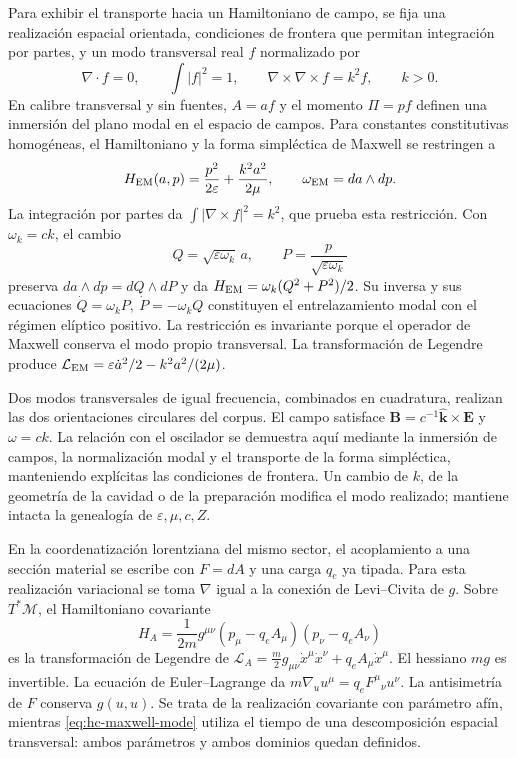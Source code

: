 Para exhibir el transporte hacia un Hamiltoniano de campo, se fija una
realización espacial orientada, condiciones de frontera que permitan
integración por partes, y un modo transversal real \(f\) normalizado por
\[
 \nabla\cdot f=0,\qquad \int|f|^2=1,\qquad
 \nabla\times\nabla\times f=k^2f,\qquad k>0.
\]
En calibre transversal y sin fuentes, \(A=af\) y el momento
\(\Pi=pf\) definen una inmersión del plano modal en el espacio de
campos. Para constantes constitutivas homogéneas, el Hamiltoniano y la
forma simpléctica de Maxwell se restringen a
\begin{equation}
 H_{\rm EM}(a,p)=\frac{p^2}{2\varepsilon}
 +\frac{k^2a^2}{2\mu},\qquad \omega_{\rm EM}=da\wedge dp.
 \label{eq:hc-maxwell-mode}
\end{equation}
La integración por partes da
\(\int|\nabla\times f|^2=k^2\), que prueba esta restricción.
Con \(\omega_k=ck\), el cambio
\begin{equation}
 Q=\sqrt{\varepsilon\omega_k}\,a,
 \qquad P=\frac{p}{\sqrt{\varepsilon\omega_k}}
 \label{eq:hc-maxwell-symplectic}
\end{equation}
preserva \(da\wedge dp=dQ\wedge dP\) y da
\(H_{\rm EM}=\omega_k(Q^2+P^2)/2\). Su inversa y sus ecuaciones
\(\dot Q=\omega_kP,\ \dot P=-\omega_kQ\)
constituyen el entrelazamiento modal con el régimen elíptico positivo.
La restricción es invariante porque el operador de Maxwell conserva el
modo propio transversal. La transformación de Legendre produce
\(\mathcal L_{\rm EM}=\varepsilon\dot a^2/2-k^2a^2/(2\mu)\).

Dos modos transversales de igual frecuencia, combinados en cuadratura,
realizan las dos orientaciones circulares del corpus. El campo satisface
\(\mathbf B=c^{-1}\widehat{\mathbf k}\times\mathbf E\) y
\(\omega=ck\). La relación con el oscilador se demuestra aquí mediante
la inmersión de campos, la normalización modal y el transporte de la forma
simpléctica, manteniendo explícitas las condiciones de frontera.
Un cambio de \(k\), de la geometría de la cavidad o de la preparación
modifica el modo realizado; mantiene intacta la genealogía de
\(\varepsilon,\mu,c,Z\).

En la coordenatización lorentziana del mismo sector, el acoplamiento a una sección
material se escribe con \(F=dA\) y una carga \(q_e\) ya tipada.
Para esta realización variacional se toma \(\nabla\) igual a la
conexión de Levi--Civita de \(g\). Sobre
\(T^*\mathcal M\), el Hamiltoniano covariante
\[
 H_A=\frac1{2m}g^{\mu\nu}(p_\mu-q_eA_\mu)(p_\nu-q_eA_\nu)
\]
es la transformación de Legendre de
\(\mathcal L_A=\frac m2g_{\mu\nu}\dot x^\mu\dot x^\nu
+q_eA_\mu\dot x^\mu\). El hessiano \(mg\) es invertible.
La ecuación de Euler--Lagrange da
\(m\nabla_u u^\mu=q_eF^\mu{}_{\nu}u^\nu\).
La antisimetría de \(F\) conserva \(g(u,u)\). Se trata de la
realización covariante con parámetro afín, mientras
\eqref{eq:hc-maxwell-mode} utiliza el tiempo de una descomposición
espacial transversal: ambos parámetros y ambos dominios quedan definidos.

